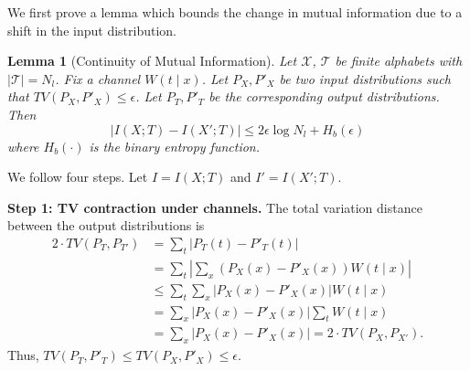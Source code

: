 \documentclass[conference]{IEEEtran}
\newtheorem{lemma}{Lemma}
\begin{document}
We first prove a lemma which bounds the change in mutual information due to a shift in the input distribution.
\begin{lemma}[Continuity of Mutual Information]
Let $\mathcal{X}$, $\mathcal{T}$ be finite alphabets with $|\mathcal{T}|=N_l$. Fix a channel $W(t\mid x)$. Let $P_X, P'_{X}$ be two input distributions such that $TV(P_X,P'_{X}) \le \epsilon$. Let $P_T, P'_{T}$ be the corresponding output distributions. Then
\begin{equation*}
\big| I(X;T)-I(X';T)\big| \le 2\epsilon \log N_l + H_b(\epsilon)
\end{equation*}
where $H_b(\cdot)$ is the binary entropy function. 
\end{lemma}
\begin{IEEEproof}
We follow four steps. Let $I=I(X;T)$ and $I'=I(X';T)$.

\textbf{Step 1: TV contraction under channels.}
The total variation distance between the output distributions is
\begin{align}
    2 \cdot TV(P_T, P_{T'}) &= \sum_t |P_T(t)-P'_{T}(t)| \nonumber \\
    &= \sum_t \left|\sum_x (P_X(x)-P'_{X}(x))W(t\mid x)\right| \nonumber \\
    &\le \sum_t \sum_x |P_X(x)-P'_{X}(x)| W(t\mid x) \nonumber \\
    &= \sum_x |P_X(x)-P'_{X}(x)| \sum_t W(t\mid x) \nonumber \\
    &= \sum_x |P_X(x)-P'_{X}(x)| = 2 \cdot TV(P_X, P_{X'}).
\end{align}
Thus, $TV(P_T,P'_{T})\le TV(P_X,P'_{X})\le\epsilon$.


\end{IEEEproof}
\end{document}

